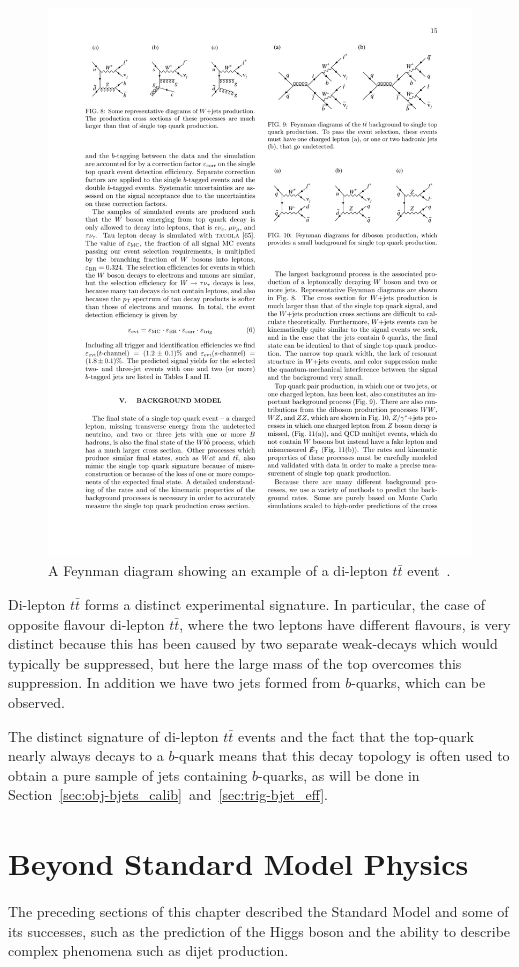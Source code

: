\begin{figure}[!hbt]
  \begin{center}
    \includegraphics[width=0.6\linewidth, angle=0]{figs/Theory/ttbar.pdf}
  \end{center}
  \caption[A Feynman diagram showing an example of a di-lepton $t\bar{t}$ event.]
  {A Feynman diagram showing an example of a di-lepton $t\bar{t}$ event~\cite{theo-ttbar_feyn}.}
  \label{fig:theo-ttbar}
\end{figure}

Di-lepton $t\bar{t}$ forms a distinct experimental signature.
In particular, the case of opposite flavour di-lepton $t\bar{t}$, where the two leptons have different flavours, is very distinct
because this has been caused by two separate weak-decays which would typically be suppressed,
but here the large mass of the top overcomes this suppression.
In addition we have two jets formed from $b$-quarks, which can be observed.

The distinct signature of di-lepton $t\bar{t}$ events and the fact that the top-quark nearly always decays to a $b$-quark
means that this decay topology is often used to obtain a pure sample of jets containing $b$-quarks,
as will be done in Section~\ref{sec:obj-bjets_calib}~and~\ref{sec:trig-bjet_eff}.

\section{Beyond Standard Model Physics}
\label{sec:theo-bsm}

The preceding sections of this chapter described the Standard Model
and some of its successes,
such as the prediction of the Higgs boson and the ability to describe complex phenomena such as dijet production.

